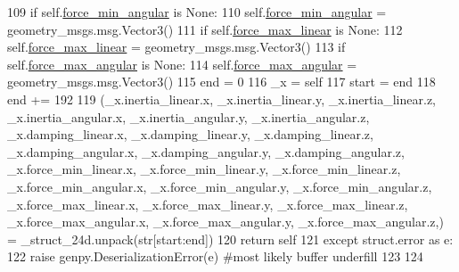 \begin{DoxyCode}
109       \textcolor{keywordflow}{if} self.\hyperlink{classjaco__msgs_1_1srv_1_1__SetForceControlParams_1_1SetForceControlParamsRequest_a059ff47ab34fd7730218c1a609bbb956}{force\_min\_angular} \textcolor{keywordflow}{is} \textcolor{keywordtype}{None}:
110         self.\hyperlink{classjaco__msgs_1_1srv_1_1__SetForceControlParams_1_1SetForceControlParamsRequest_a059ff47ab34fd7730218c1a609bbb956}{force\_min\_angular} = geometry\_msgs.msg.Vector3()
111       \textcolor{keywordflow}{if} self.\hyperlink{classjaco__msgs_1_1srv_1_1__SetForceControlParams_1_1SetForceControlParamsRequest_aae9888fc8efdf00c292dfaf866c90f7f}{force\_max\_linear} \textcolor{keywordflow}{is} \textcolor{keywordtype}{None}:
112         self.\hyperlink{classjaco__msgs_1_1srv_1_1__SetForceControlParams_1_1SetForceControlParamsRequest_aae9888fc8efdf00c292dfaf866c90f7f}{force\_max\_linear} = geometry\_msgs.msg.Vector3()
113       \textcolor{keywordflow}{if} self.\hyperlink{classjaco__msgs_1_1srv_1_1__SetForceControlParams_1_1SetForceControlParamsRequest_a1e80687d03a465ee0a3b22923e11d7d1}{force\_max\_angular} \textcolor{keywordflow}{is} \textcolor{keywordtype}{None}:
114         self.\hyperlink{classjaco__msgs_1_1srv_1_1__SetForceControlParams_1_1SetForceControlParamsRequest_a1e80687d03a465ee0a3b22923e11d7d1}{force\_max\_angular} = geometry\_msgs.msg.Vector3()
115       end = 0
116       \_x = self
117       start = end
118       end += 192
119       (\_x.inertia\_linear.x, \_x.inertia\_linear.y, \_x.inertia\_linear.z, \_x.inertia\_angular.x, 
      \_x.inertia\_angular.y, \_x.inertia\_angular.z, \_x.damping\_linear.x, \_x.damping\_linear.y, \_x.damping\_linear.z, 
      \_x.damping\_angular.x, \_x.damping\_angular.y, \_x.damping\_angular.z, \_x.force\_min\_linear.x, \_x.force\_min\_linear.y, 
      \_x.force\_min\_linear.z, \_x.force\_min\_angular.x, \_x.force\_min\_angular.y, \_x.force\_min\_angular.z, \_x.force\_max\_linear.x, 
      \_x.force\_max\_linear.y, \_x.force\_max\_linear.z, \_x.force\_max\_angular.x, \_x.force\_max\_angular.y, 
      \_x.force\_max\_angular.z,) = \_struct\_24d.unpack(str[start:end])
120       \textcolor{keywordflow}{return} self
121     \textcolor{keywordflow}{except} struct.error \textcolor{keyword}{as} e:
122       \textcolor{keywordflow}{raise} genpy.DeserializationError(e) \textcolor{comment}{#most likely buffer underfill}
123 
124 
\end{DoxyCode}
